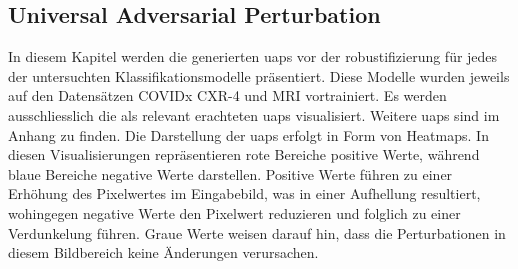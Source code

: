\subsection{Universal Adversarial Perturbation}
In diesem Kapitel werden die generierten \acrlong{uap}s vor der \Gls{robustifizierung} für jedes der untersuchten Klassifikationsmodelle präsentiert. Diese Modelle wurden jeweils auf den Datensätzen COVIDx CXR-4 und MRI vortrainiert. Es werden ausschliesslich die als relevant erachteten \acrshort{uap}s visualisiert. Weitere \acrshort{uap}s sind im Anhang zu finden. Die Darstellung der \acrshort{uap}s erfolgt in Form von Heatmaps. In diesen Visualisierungen repräsentieren rote Bereiche positive Werte, während blaue Bereiche negative Werte darstellen. Positive Werte führen zu einer Erhöhung des Pixelwertes im Eingabebild, was in einer Aufhellung resultiert, wohingegen negative Werte den Pixelwert reduzieren und folglich zu einer Verdunkelung führen. Graue Werte weisen darauf hin, dass die Perturbationen in diesem Bildbereich keine Änderungen verursachen.

